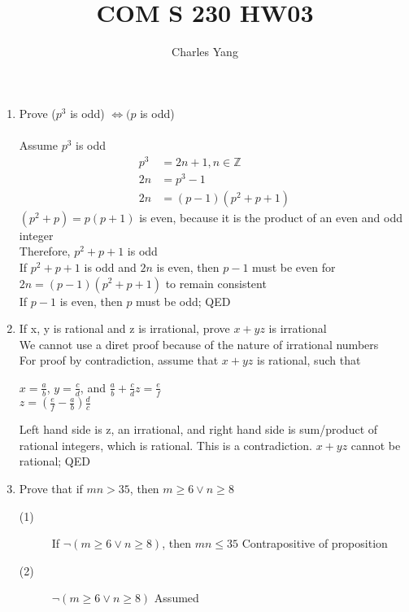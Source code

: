 \documentclass[11pt]{article}
\title{COM S 230 HW03}
\author{Charles Yang}
\begin{document}
    \maketitle

    \begin{enumerate}
        \item Prove ($p^3$ is odd) $\iff (p$ is odd)\\\\
            Assume $p^3$ is odd
            \begin{align*}
                p^3 &= 2n + 1, n \in \mathbb{Z}\\
                2n &= p^3 - 1\\
                2n &= (p-1)(p^2+p+1)
            \end{align*}
            $(p^2+p) = p(p+1)$ is even, because it is the product of an even and odd integer\\
            Therefore, $p^2+p+1$ is odd\\
            If $p^2+p+1$ is odd and $2n$ is even, then $p-1$ must be even for $2n = (p-1)(p^2+p+1)$ to remain consistent\\
            If $p - 1$ is even, then $p$ must be odd; QED
        \item If x, y is rational and z is irrational, prove $x+yz$ is irrational\\
            We cannot use a diret proof because of the nature of irrational numbers\\
            For proof by contradiction, assume that $x+yz$ is rational, such that
            \begin{center}
                $x = \frac{a}{b}$, $y = \frac{c}{d}$, and $\frac{a}{b}+\frac{c}{d}z = \frac{e}{f}$\\
                $z=(\frac{e}{f}-\frac{a}{b})\frac{d}{c}$
            \end{center}
            Left hand side is z, an irrational, and right hand side is sum/product of rational integers, which is rational.
            This is a contradiction. $x+yz$ cannot be rational; QED
        \item Prove that if $mn > 35$, then $m \geq 6 \lor n \geq 8$
            \begin{description}
                \item[(1)] If $\neg (m \geq 6 \lor n \geq 8)$, then $mn \leq 35$ \null\hfill Contrapositive of proposition
                \item[(2)] $\neg (m \geq 6 \lor n \geq 8)$ \null\hfill Assumed

\end{description}
\end{enumerate}
\end{document}
